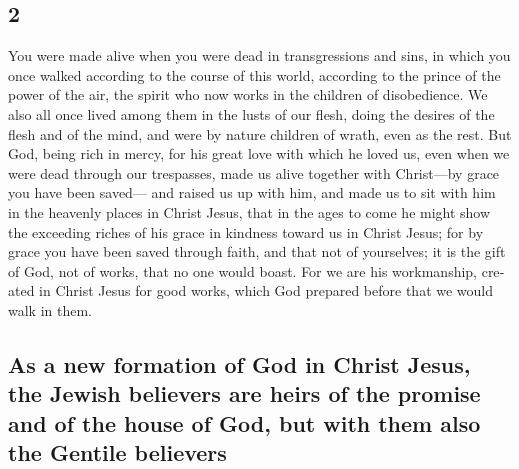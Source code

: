 \begin{paracol}{2}
\begin{otherlanguage}{english}
\hypertarget{section-3}{%
\section{2}\label{section-3}}

 You were made alive when you were dead in transgressions
and sins,  in which you once walked according to the
course of this world, according to the prince of the power of the air,
the spirit who now works in the children of disobedience. 
We also all once lived among them in the lusts of our flesh, doing the
desires of the flesh and of the mind, and were by nature children of
wrath, even as the rest.  But God, being rich in mercy,
for his great love with which he loved us,  even when we
were dead through our trespasses, made us alive together with
Christ---by grace you have been saved---  and raised us up
with him, and made us to sit with him in the heavenly places in Christ
Jesus,  that in the ages to come he might show the
exceeding riches of his grace in kindness toward us in Christ Jesus;
 for by grace you have been saved through faith, and that
not of yourselves; it is the gift of God,  not of works,
that no one would boast.  For we are his workmanship,
created in Christ Jesus for good works, which God prepared before that
we would walk in them.

\hypertarget{as-a-new-formation-of-god-in-christ-jesus-the-jewish-believers-are-heirs-of-the-promise-and-of-the-house-of-god-but-with-them-also-the-gentile-believers}{%
\subsection{As a new formation of God in Christ Jesus, the Jewish
believers are heirs of the promise and of the house of God, but with
them also the Gentile
believers}\label{as-a-new-formation-of-god-in-christ-jesus-the-jewish-believers-are-heirs-of-the-promise-and-of-the-house-of-god-but-with-them-also-the-gentile-believers}}


\end{otherlanguage}
\end{paracol}
